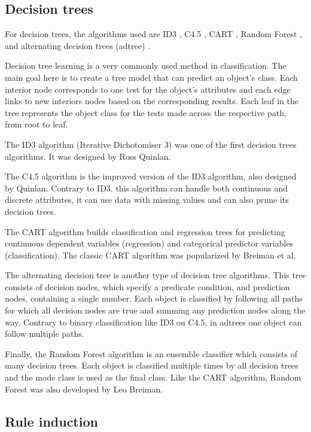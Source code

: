 \documentclass[a4paper]{llncs}
\begin{document}
\subsection{Decision trees}

For decision trees, the algorithms used are ID3 \cite{id3}, C4.5 \cite{c45}, CART \cite{cart},
Random Forest \cite{random_forest}, and alternating decision trees (adtree) \cite{adtree}.

Decision tree learning is a very commonly used method in classification. The main goal here is to
create a tree model that can predict an object's class. Each interior node corresponds
to one test for the object's attributes and each edge links to new interiors nodes based on the corresponding
results. Each leaf in the tree represents the object class for the tests made
across the respective path, from root to leaf.

The ID3 algorithm (Iterative Dichotomiser 3) was one of the first decision trees algorithms.
It was designed by Ross Quinlan.

The C4.5 algorithm is the improved version of the ID3 algorithm, also designed by Quinlan.
Contrary to ID3, this algorithm can handle both continuous and discrete attributes,
it can use data with missing values and can also prune its decision trees.

The CART algorithm builds classification and regression trees for predicting continuous dependent variables (regression)
and categorical predictor variables (classification). The classic CART algorithm was popularized by Breiman et al. \cite{cart}

The alternating decision tree is another type of decision tree algorithms. This tree
consists of decision nodes, which specify a predicate condition, and prediction nodes, containing a single number.
Each object is classified by following all paths for which all decision nodes are true and summing any
prediction nodes along the way. Contrary to binary classification like ID3 ou C4.5, in adtrees one
object can follow multiple paths. 

Finally, the Random Forest algorithm is an ensemble classifier which consists of many decision trees.
Each object is classified multiple times by all decision trees and the mode class is used as the final class.
Like the CART algorithm, Random Forest was also developed by Leo Breiman.

\subsection{Rule induction}
\end{document}

